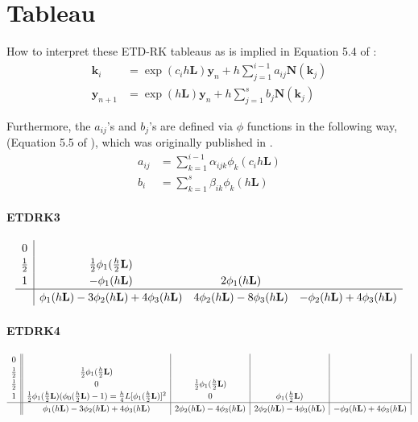 \documentclass{article}
\newcommand{\bb}[1]{\mathbf{#1}}
\theoremstyle{definition}
\begin{document}
\section{Tableau}
How to interpret these ETD-RK tableaus as is implied in Equation 5.4 of \cite{MinchevWright}:
\begin{align}
\bb{k}_i &= \exp(c_ih\bb{L})\bb{y}_n + h\sum_{j=1}^{i-1}a_{ij}\bb{N}(\bb{k}_j) \label{eqn:eRK1}\\
\bb{y}_{n+1} &= \exp(h\bb{L})\bb{y}_n + h\sum_{j=1}^s b_j\bb{N}(\bb{k}_j) \label{eqn:eRK3}\
\end{align}

Furthermore, the $a_{ij}$'s and $b_j$'s are defined via $\phi$ functions in the following way, (Equation 5.5 of \cite{MinchevWright}), which was originally published in \cite{Friedli1978}.
\begin{align*}
a_{ij} &= \sum_{k=1}^{i-1} \alpha_{ijk}\phi_k(c_ih\bb{L}) \\
b_{i} &= \sum_{k=1}^s \beta_{ik} \phi_k(h\bb{L})
\end{align*}


\paragraph{ETDRK3}
\[
\renewcommand\arraystretch{1.2}
\begin{array}
{c|cccc}
0& &  & \\
\frac{1}{2}& \frac{1}{2}\phi_1(\frac{h}{2}\bb{L}) &  &\\
1 & -\phi_1(h\bb{L}) & 2\phi_1(h\bb{L})&\\ \hline
& \phi_1(h\bb{L})-3\phi_2(h\bb{L})+4\phi_3(h\bb{L}) &4\phi_2(h\bb{L}) -8\phi_3(h\bb{L}) & -\phi_2(h\bb{L}) + 4\phi_3(h\bb{L}) 
\end{array}
\]

\paragraph{ETDRK4}
\[
\renewcommand\arraystretch{1.2}
\begin{array}
{c||c|c|c|c|c}
0& & & & \\
\frac{1}{2}& \frac{1}{2}\phi_1(\frac{h}{2}\bb{L}) &  & & \\
\frac{1}{2} & 0 & \frac{1}{2}\phi_1(\frac{h}{2}\bb{L})& &\\ 
1 &  \frac{1}{2}\phi_1(\frac{h}{2}\bb{L}) (\phi_0(\frac{h}{2}\bb{L})-1)= \frac{h}{4}L[ \phi_1(\frac{h}{2}\bb{L})]^2 & 0 & \phi_1(\frac{h}{2}\bb{L}) & \\\hline
& \phi_1(h\bb{L})-3\phi_2(h\bb{L})+4\phi_3(h\bb{L})  &2\phi_2(h\bb{L}) -4\phi_3(h\bb{L})&2\phi_2(h\bb{L}) -4\phi_3(h\bb{L}) & -\phi_2(h\bb{L}) + 4\phi_3(h\bb{L}) 
\end{array}
\]
\end{document}

